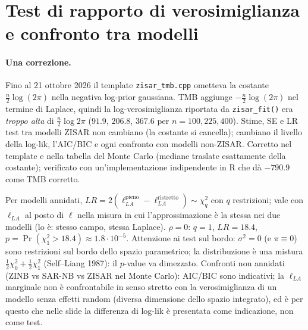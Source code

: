 \documentclass[11pt,a4paper]{article}
\begin{document}
\section{Test di rapporto di verosimiglianza e confronto tra modelli}\label{app:lr}
\paragraph{Una correzione.} Fino al 21 ottobre 2026 il template \texttt{zisar\_tmb.cpp} ometteva la costante $\tfrac n2\log(2\pi)$ nella negativa log-prior gaussiana. TMB aggiunge $-\tfrac n2\log(2\pi)$ nel termine di Laplace, quindi la log-verosimiglianza riportata da \texttt{zisar\_fit()} era \emph{troppo alta} di $\tfrac n2\log 2\pi$ ($91.9$, $206.8$, $367.6$ per $n=100,225,400$). Stime, SE e LR test tra modelli ZISAR non cambiano (la costante si cancella); cambiano il livello della log-lik, l'AIC/BIC e ogni confronto con modelli non-ZISAR. Corretto nel template e nella tabella del Monte Carlo (mediane traslate esattamente della costante); verificato con un'implementazione indipendente in R che dà $-790.9$ come TMB corretto.


Per modelli annidati, $LR=2(\ell_{LA}^{\text{pieno}}-\ell_{LA}^{\text{ristretto}})\sim\chi^2_q$ con $q$ restrizioni; vale con $\ell_{LA}$ al posto di $\ell$ nella misura in cui l'approssimazione è la stessa nei due modelli (lo è: stesso campo, stessa Laplace). $\rho=0$: $q=1$, $LR=18.4$, $p=\Pr(\chi^2_1>18.4)\approx1.8\cdot10^{-5}$. Attenzione ai test sul bordo: $\sigma^2=0$ (e $\pi\equiv0$) sono restrizioni sul bordo dello spazio parametrico; la distribuzione è una mistura $\tfrac12\chi^2_0+\tfrac12\chi^2_1$ (Self--Liang 1987): il $p$-value va dimezzato. Confronti non annidati (ZINB vs SAR-NB vs ZISAR nel Monte Carlo): AIC/BIC sono indicativi; la $\ell_{LA}$ marginale non è confrontabile in senso stretto con la verosimiglianza di un modello senza effetti random (diversa dimensione dello spazio integrato), ed è per questo che nelle slide la differenza di log-lik è presentata come indicazione, non come test.
\end{document}
